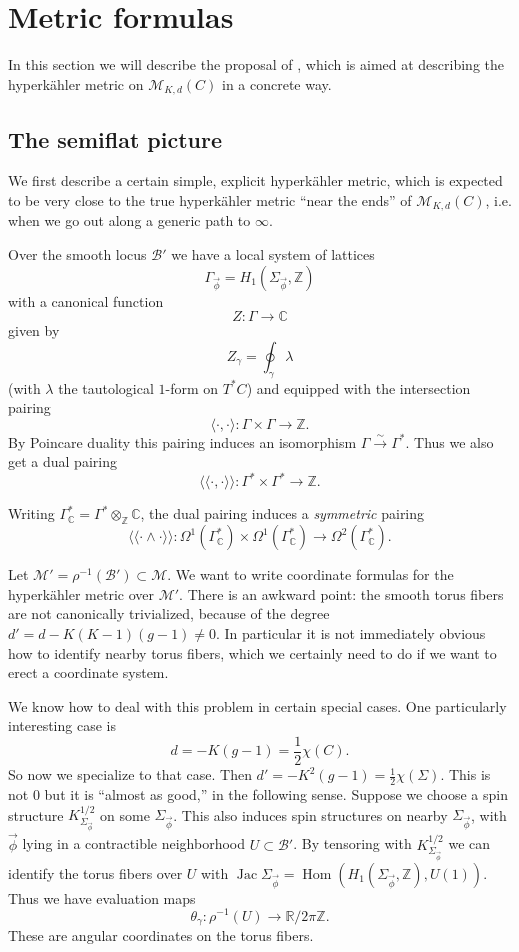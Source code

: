 \documentclass[12pt,letterpaper,reqno]{article}
\numberwithin{equation}{section}
\newcommand{\cB}{\ensuremath{\mathcal B}}
\newcommand{\cM}{\ensuremath{\mathcal M}}
\newcommand{\R}{\ensuremath{\mathbb R}}
\newcommand{\C}{\ensuremath{\mathbb C}}
\newcommand{\Z}{\ensuremath{\mathbb Z}}
\newcommand{\half}{\ensuremath{\frac{1}{2}}}
\newcommand{\hk}{hyperk\"ahler\xspace}
\newcommand{\IP}[1]{\langle#1\rangle}
\newcommand{\DIP}[1]{\langle\!\langle#1\rangle\!\rangle}
\newcommand{\simarrow}{\xrightarrow\sim}
\newcommand{\ti}[1]{\textit{#1}}
\DeclareMathOperator{\Hom}{Hom}
\DeclareMathOperator{\Jac}{Jac}
\begin{document}
\section{Metric formulas}

In this section we will
describe the proposal of \cite{Gaiotto:2008cd,Gaiotto:2009hg,Gaiotto2012}, which is aimed at describing the
\hk metric on $\cM_{K,d}(C)$ in a concrete way.


\subsection{The semiflat picture}

We first describe a certain simple, explicit \hk metric, which is expected
to be very close to the true \hk metric ``near the ends'' of
$\cM_{K,d}(C)$, i.e. when we go out along a generic path to $\infty$.

Over the smooth locus $\cB'$ we have a local system of lattices
$$\Gamma_{\vec \phi} = H_1(\Sigma_{\vec \phi},\Z)$$
with a canonical function
$$ Z: \Gamma \to \C $$
given by
$$ Z_\gamma = \oint_\gamma \lambda $$
(with $\lambda$ the tautological $1$-form on $T^* C$)
and equipped with the intersection pairing
$$ \IP{\cdot,\cdot}: \Gamma \times \Gamma \to \Z. $$
By Poincare duality this pairing induces an isomorphism
$\Gamma \simarrow \Gamma^*$. Thus we also get a dual pairing
$$ \DIP{\cdot,\cdot}: \Gamma^* \times \Gamma^* \to \Z. $$

Writing $\Gamma^*_\C = \Gamma^* \otimes_\Z \C$,
the dual pairing induces a \ti{symmetric} pairing
$$ \DIP{\cdot \wedge \cdot}: \Omega^1(\Gamma^*_\C) \times \Omega^1(\Gamma^*_\C) \to \Omega^2(\Gamma^*_\C). $$

Let $\cM' = \rho^{-1}(\cB') \subset \cM$.
We want to write coordinate formulas for the \hk metric over $\cM'$.
There is an awkward point: the smooth torus fibers are
not canonically trivialized, because of the
degree $d' = d - K(K-1)(g-1) \neq 0$. In particular it is not immediately obvious
how to identify nearby torus fibers, which we certainly need to do if
we want to erect a coordinate system.

We know how to deal with this problem
in certain special cases. One particularly
interesting case is
\begin{equation}
d = -K(g-1) = \half \chi(C).
\end{equation}
So now we specialize to that case.
Then $d' = -K^2(g-1) = \half \chi(\Sigma)$. This is not $0$ but it is
``almost as good,'' in the following sense.
Suppose we choose a spin structure
$K_{\Sigma_{\vec\phi}}^{1/2}$ on some $\Sigma_{\vec \phi}$.
This also induces
spin structures on nearby $\Sigma_{\vec \phi}$,
with $\vec\phi$ lying in a contractible neighborhood $U \subset \cB'$.
By tensoring with $K_{\Sigma_{\vec \phi}}^{1/2}$ we can identify
the torus fibers over $U$
with $\Jac \Sigma_{\vec \phi} = \Hom(H_1(\Sigma_{\vec \phi},\Z),U(1))$.
Thus we have evaluation maps
$$ \theta_\gamma: \rho^{-1}(U) \to \R / 2 \pi \Z. $$
These are angular coordinates on the torus fibers.
\end{document}

